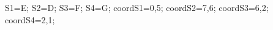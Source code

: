 \documentclass[exercice]{thedocument}%
\begin{document}
%
    \>S1=E;%
    \>S2=D;%
    \>S3=F;%
    \>S4=G;%
    \>coordS1=0,5;%
    \>coordS2=7,6;%
    \>coordS3=6,2;%
    \>coordS4=2,1;%
\end{document}
